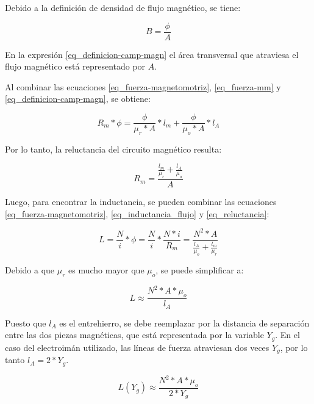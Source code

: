 \noindent Debido a la definición de  densidad de flujo magnético, se tiene:

\begin{equation}\label{eq_definicion-camp-magn}
	B=\frac{\phi}{A}
\end{equation}

En la expresión \ref{eq_definicion-camp-magn} el área transversal que atraviesa el flujo magnético está representado por $A$.

Al combinar las ecuaciones \ref{eq_fuerza-magnetomotriz}, \ref{eq_fuerza-mm} y \ref{eq_definicion-camp-magn}, se obtiene:

\begin{equation}
	R_{m}*\phi=\frac{\phi}{\mu_{r}*A}*l_{m}+\frac{\phi}{\mu_{o}*A}*l_{A}
\end{equation}

Por lo tanto, la reluctancia del circuito magnético resulta:

\begin{equation} \label{eq_reluctancia}
	R_{m}=\frac{\frac{l_{m}}{\mu_{r}}+\frac{l_{A}}{\mu_{o}}}{A}
\end{equation}

\noindent Luego, para encontrar la inductancia, se pueden combinar las ecuaciones  \ref{eq_fuerza-magnetomotriz}, \ref{eq_inductancia_flujo} y \ref{eq_reluctancia}:

\begin{equation}\label{eq_inductancia_2}
	L=\frac{N}{i}*\phi=\frac{N}{i}*\frac{N*i}{R_{m}}=\frac{N^{2}*A}{\frac{l_{A}}{\mu_{o}}+\frac{l_{m}}{\mu_{r}}}
\end{equation}

\noindent Debido a que $\mu_{r}$ es mucho mayor que $\mu_{o}$, se puede simplificar a:

\begin{equation} \label{eq_inductancia_gap}
	L\approx\frac{N^{2}*A*\mu_{o}}{l_{A}}
\end{equation}

\noindent \noindent Puesto que $l_{A}$ es el entrehierro, se debe reemplazar por la distancia de separación entre las dos piezas magnéticas, que está representada por la variable $Y_{g}$. En el caso del electroimán utilizado, las líneas de fuerza atraviesan dos veces $Y_{g}$, por lo tanto $l_{A}=2*Y_{g}$.


\begin{equation}\label{eq_inductancia_vs_y}
	L(Y_g)\approx\frac{{N^{2}*A*\mu_{o}}}{2*Y_{g}}
\end{equation}

